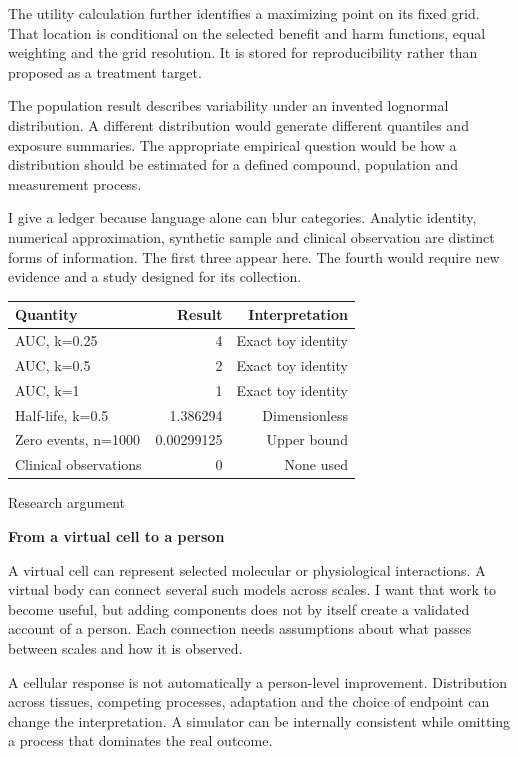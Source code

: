 \documentclass[10pt]{article}
\begin{document}
The utility calculation further identifies a maximizing point on its fixed grid. That location is conditional on the selected benefit and harm functions, equal weighting and the grid resolution. It is stored for reproducibility rather than proposed as a treatment target.\par
The population result describes variability under an invented lognormal distribution. A different distribution would generate different quantiles and exposure summaries. The appropriate empirical question would be how a distribution should be estimated for a defined compound, population and measurement process.\par
I give a ledger because language alone can blur categories. Analytic identity, numerical approximation, synthetic sample and clinical observation are distinct forms of information. The first three appear here. The fourth would require new evidence and a study designed for its collection.\par
{\small\begin{tabularx}{\linewidth}{Xrr}\toprule
Quantity & Result & Interpretation\\\midrule
AUC, k=0.25 & 4 & Exact toy identity\\
AUC, k=0.5 & 2 & Exact toy identity\\
AUC, k=1 & 1 & Exact toy identity\\
Half-life, k=0.5 & 1.386294 & Dimensionless\\
Zero events, n=1000 & 0.00299125 & Upper bound\\
Clinical observations & 0 & None used\\
\bottomrule\end{tabularx}}\par
\clearpage
{\small\color{accent}Research argument}\par
{\LARGE\bfseries\color{ink}From a virtual cell to a person}\par\vspace{7pt}
A virtual cell can represent selected molecular or physiological interactions. A virtual body can connect several such models across scales. I want that work to become useful, but adding components does not by itself create a validated account of a person. Each connection needs assumptions about what passes between scales and how it is observed.\par
A cellular response is not automatically a person-level improvement. Distribution across tissues, competing processes, adaptation and the choice of endpoint can change the interpretation. A simulator can be internally consistent while omitting a process that dominates the real outcome.\par
\end{document}
